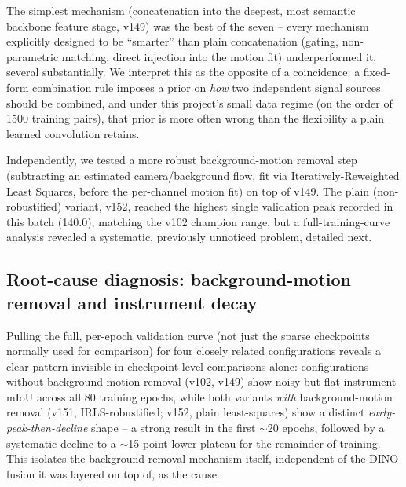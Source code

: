\documentclass[conference]{IEEEtran}
\begin{document}
The simplest mechanism (concatenation into the deepest, most semantic
backbone feature stage, v149) was the best of the seven -- every
mechanism explicitly designed to be ``smarter'' than plain concatenation
(gating, non-parametric matching, direct injection into the motion fit)
underperformed it, several substantially. We interpret this as the
opposite of a coincidence: a fixed-form combination rule imposes a prior
on \emph{how} two independent signal sources should be combined, and
under this project's small data regime (on the order of 1500 training
pairs), that prior is more often wrong than the flexibility a plain
learned convolution retains.

Independently, we tested a more robust background-motion removal step
(subtracting an estimated camera/background flow, fit via
Iteratively-Reweighted Least Squares, before the per-channel motion fit)
on top of v149. The plain (non-robustified) variant, v152, reached the
highest single validation peak recorded in this batch (140.0), matching
the v102 champion range, but a full-training-curve analysis revealed a
systematic, previously unnoticed problem, detailed next.

\subsection{Root-cause diagnosis: background-motion removal and instrument decay}
\label{sec:bg_removal}

Pulling the full, per-epoch validation curve (not just the sparse
checkpoints normally used for comparison) for four closely related
configurations reveals a clear pattern invisible in checkpoint-level
comparisons alone: configurations without background-motion removal
(v102, v149) show noisy but flat instrument mIoU across all 80 training
epochs, while both variants \emph{with} background-motion removal (v151,
IRLS-robustified; v152, plain least-squares) show a distinct
\emph{early-peak-then-decline} shape -- a strong result in the first
$\sim$20 epochs, followed by a systematic decline to a $\sim$15-point
lower plateau for the remainder of training. This isolates the
background-removal mechanism itself, independent of the DINO fusion it
was layered on top of, as the cause.
\end{document}
